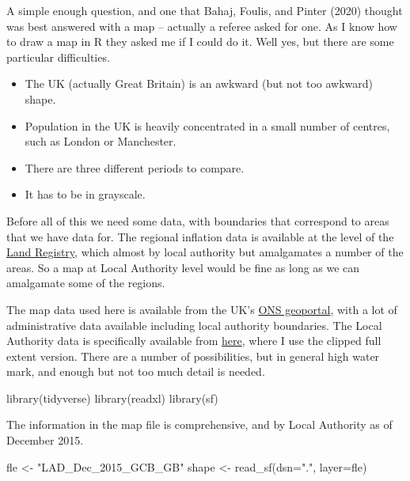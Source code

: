 \documentclass[
  letterpaper,
]{book}
\newenvironment{Shaded}{\begin{snugshade}}{\end{snugshade}}
\newcommand{\AttributeTok}[1]{\textcolor[rgb]{0.40,0.45,0.13}{#1}}
\newcommand{\FunctionTok}[1]{\textcolor[rgb]{0.28,0.35,0.67}{#1}}
\newcommand{\NormalTok}[1]{\textcolor[rgb]{0.00,0.23,0.31}{#1}}
\newcommand{\OtherTok}[1]{\textcolor[rgb]{0.00,0.23,0.31}{#1}}
\newcommand{\StringTok}[1]{\textcolor[rgb]{0.13,0.47,0.30}{#1}}
\providecommand{\tightlist}{%
  \setlength{\itemsep}{0pt}\setlength{\parskip}{0pt}}\usepackage{longtable,booktabs,array}
\begin{document}
A simple enough question, and one that Bahaj, Foulis, and Pinter (2020)
thought was best answered with a map -- actually a referee asked for
one. As I know how to draw a map in R they asked me if I could do it.
Well yes, but there are some particular difficulties.

\begin{itemize}
\tightlist
\item
  The UK (actually Great Britain) is an awkward (but not too awkward)
  shape.
\item
  Population in the UK is heavily concentrated in a small number of
  centres, such as London or Manchester.
\item
  There are three different periods to compare.
\item
  It has to be in grayscale.
\end{itemize}

Before all of this we need some data, with boundaries that correspond to
areas that we have data for. The regional inflation data is available at
the level of the
\href{https://www.gov.uk/government/organisations/land-registry}{Land
Registry}, which almost by local authority but amalgamates a number of
the areas. So a map at Local Authority level would be fine as long as we
can amalgamate some of the regions.

The map data used here is available from the UK's
\href{https://geoportal.statistics.gov.uk/}{ONS geoportal}, with a lot
of administrative data available including local authority boundaries.
The Local Authority data is specifically available from
\href{https://geoportal.statistics.gov.uk/maps/lad-dec-2015-generalised-clipped-boundaries-gb}{here},
where I use the clipped full extent version. There are a number of
possibilities, but in general high water mark, and enough but not too
much detail is needed.

\begin{Shaded}
\begin{Highlighting}[]
\FunctionTok{library}\NormalTok{(tidyverse)}
\FunctionTok{library}\NormalTok{(readxl)}
\FunctionTok{library}\NormalTok{(sf)}
\end{Highlighting}
\end{Shaded}

The information in the map file is comprehensive, and by Local Authority
as of December 2015.

\begin{Shaded}
\begin{Highlighting}[]
\NormalTok{fle }\OtherTok{\textless{}{-}} \StringTok{"LAD\_Dec\_2015\_GCB\_GB"}
\NormalTok{shape }\OtherTok{\textless{}{-}} \FunctionTok{read\_sf}\NormalTok{(}\AttributeTok{dsn=}\StringTok{"."}\NormalTok{, }\AttributeTok{layer=}\NormalTok{fle)}
\end{Highlighting}
\end{Shaded}
\end{document}

